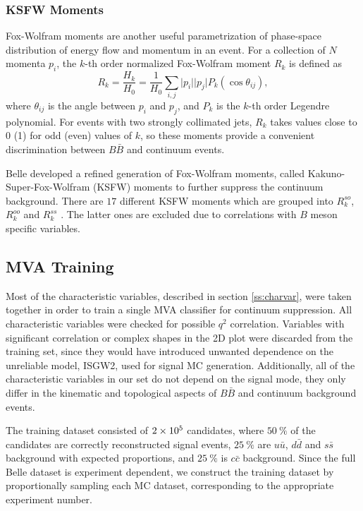 \subsubsection{KSFW Moments}
Fox-Wolfram moments are another useful parametrization of phase-space distribution of energy flow and momentum in an event. For a collection of $N$ momenta $p_i$, the $k$-th order normalized Fox-Wolfram moment $R_k$ is defined as
\begin{equation}
R_k = \frac{H_k}{H_0} = \frac{1}{H_0} \sum_{i,j} \vert p_i \vert \vert p_j \vert P_k(\cos \theta_{ij}),
\end{equation}
where $\theta_{ij}$ is the angle between $p_i$ and $p_j$, and $P_k$ is the $k$-th order Legendre polynomial. For events with two strongly collimated jets, $R_k$ takes values close to 0 (1) for odd (even) values of $k$, so these moments provide a convenient discrimination between $B \bar B$ and continuum events.

Belle developed a refined generation of Fox-Wolfram moments, called Kakuno-Super-Fox-Wolfram (KSFW) moments to further suppress the continuum background. There are $17$  different KSFW moments which are grouped into $R^{so}_k$, $R^{oo}_k$ and $R^{ss}_k$ \cite{bevan2014physics}. The latter ones are excluded due to correlations with $B$ meson specific variables.

\subsection{MVA Training}
\label{ss:qqmva}
Most of the characteristic variables, described in section \ref{ss:charvar}, were taken together in order to train a single MVA classifier for continuum suppression. All characteristic variables were checked for possible $q^2$ correlation. Variables with significant correlation or complex shapes in the 2D plot were discarded from the training set, since they would have introduced unwanted dependence on the unreliable model, ISGW2, used for signal MC generation. Additionally, all of the characteristic variables in our set do not depend on the signal mode, they only differ in the kinematic and topological aspects of $B \bar B$ and continuum background events.

The training dataset consisted of $2\times 10^{5}$ candidates, where $50~\%$ of the candidates are correctly reconstructed signal events, $25~\%$ are $u \bar u$, $d \bar d$ and $s \bar s$ background with expected proportions, and $25~\%$ is $c \bar c$ background. Since the full Belle dataset is experiment dependent, we construct the training dataset by proportionally sampling each MC dataset, corresponding to the appropriate experiment number.

